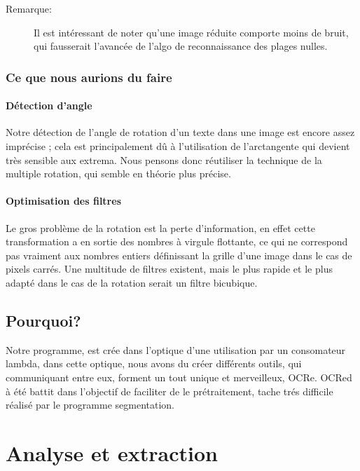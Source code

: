 \documentclass[a4paper,12pt]{report}
\begin{document}
\begin{description}
	\item[Remarque:] Il est int\'eressant de noter qu'une image r\'eduite comporte
	moins de bruit, qui fausserait l'avanc\'ee de l'algo de reconnaissance
	des plages nulles.
\end{description}

\subsection{ Ce que nous aurions du faire}
\subsubsection{ D\'etection d'angle}
Notre d\'etection de l'angle de rotation d'un texte dans une image est
encore assez impr\'ecise ; cela est principalement d\^u \`a l'utilisation
de l'arctangente qui devient tr\`es sensible aux extrema. Nous pensons
donc r\'eutiliser la technique de la multiple rotation, qui semble en
th\'eorie plus pr\'ecise.
\subsubsection{ Optimisation des filtres}
Le gros probl\`eme de la rotation est la perte d'information, en effet
cette transformation a en sortie des nombres \`a virgule flottante,
ce qui ne correspond pas vraiment aux nombres entiers d\'efinissant la
grille d'une image dans le cas de pixels carr\'es. Une multitude de
filtres existent, mais le plus rapide et le plus adapt\'e dans le cas de la
rotation serait un filtre bicubique.
\section{Pourquoi?}
Notre programme, est cr\'ee dans l'optique d'une utilisation par un
consomateur lambda, dans cette optique, nous avons du cr\'eer diff\'erents
outils, qui communiquant entre eux, forment un tout unique et
merveilleux, OCRe.
OCRed \`a \'et\'e battit dans l'objectif de faciliter de le
pr\'etraitement, tache tr\'es difficile r\'ealis\'e par le programme segmentation.





\chapter{Analyse et extraction}
\end{document}
